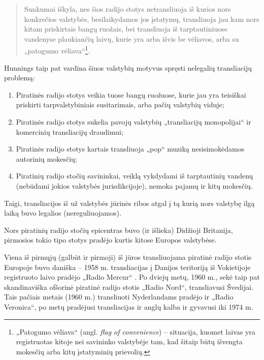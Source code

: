 \documentclass[kursinis-darbas]{vukf}
\begin{document}
\begin{quotation}
	Sunkumai iškyla, nes šios radijo stotys netransliuoja iš kurios nors konkrečios valstybės, besilaikydamos jos įstatymų, transliuoja jau kam nors kitam priskirtais bangų ruožais, bei transliuoja iš tarptautiniuose vandenyse plaukiančių laivų, kurie yra arba išvis be vėliavos, arba su „patogumo vėliava“\footnote{„Patogumo vėliava“ (angl. \emph{flag of convenience}) – situacija, kuomet laivas yra registruotas kitoje nei savininko valstybėje tam, kad šitaip būtų išvengta mokesčių arba kitų įstatyminių prievolių.}.
\end{quotation}

Hunnings taip pat vardina šiuos valstybių motyvus spręsti nelegalių transliacijų problemą:

\begin{enumerate}
	\item Piratinės radijo stotys veikia tuose bangų ruožuose, kurie jau yra teisiškai priskirti tarpvalstybiniais susitarimais, arba pačių valstybių viduje;
	\item Piratinės radijo stotys sukelia pavojų valstybių „transliacijų monopolijai“ ir komercinių transliacijų draudimui;
	\item Piratinės radijo stotys kartais transliuoja „pop“ muziką nesisimokėdamos autorinių mokesčių;
	\item Piratinių radijo stočių savininkai, veiklą vykdydami iš tarptautinių vandenų (nebūdami jokios valstybės jurisdikcijoje), nemoka pajamų ir kitų mokesčių.
\end{enumerate}

Taigi, transliacijos iš už valstybės jūrinės ribos atgal į tą kurią nors valstybę ilgą laiką buvo legalios (nereguliuojamos).

Nors piratinių radijo stočių epicentras buvo (ir išlieka) Didžioji Britanija, pirmosios tokio tipo stotys pradėjo kurtis kitose Europos valstybėse.

Viena iš pirmųjų (galbūt ir pirmoji) iš jūros transliuojama piratinė radijo stotis Europoje buvo daniška – 1958 m. transliacijas į Danijos teritoriją iš Vokietijoje registruoto laivo \cite[p.~447]{js_continuum_encyclopedia} pradėjo „Radio Mercur“ \cite[p.~237]{chs_encyclopedia_of_radio} \cite{hn_radio_mercur_when_mercury_got_wings} \cite[p.~447]{js_continuum_encyclopedia}. Po dviejų metų, 1960 m., sekė taip pat skandinaviška ofšorinė piratinė radijo stotis „Radio Nord“, transliavusi Švedijai. Tais pačiais metais (1960 m.) transliuoti Nyderlandams pradėjo ir „Radio Veronica“, po metų pradėjusi transliacijas ir anglų kalba ir gyvavusi iki 1974 m.
\end{document}
